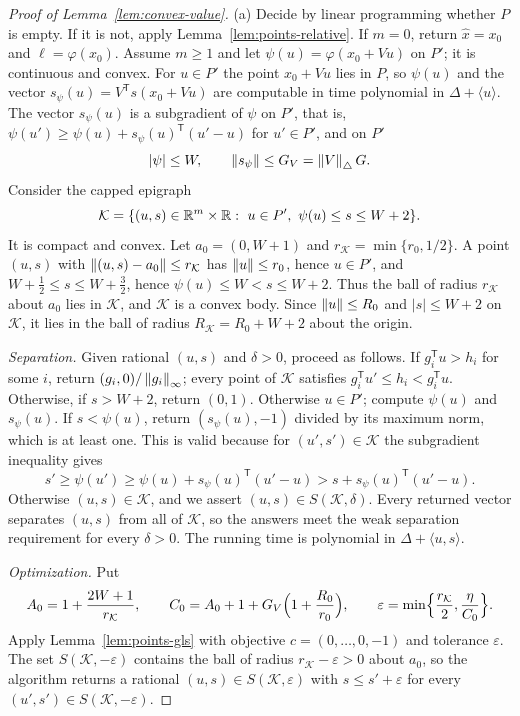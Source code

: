 \begin{proof}[Proof of Lemma~\ref{lem:convex-value}]
(a) Decide by linear programming whether $P$ is empty. If it is not, apply
Lemma~\ref{lem:points-relative}. If $m=0$, return $\hat x=x_0$ and
$\ell=\varphi(x_0)$. Assume $m\ge1$ and let $\psi(u)=\varphi(x_0+Vu)$ on
$P'$; it is continuous and convex. For $u\in P'$ the point $x_0+Vu$ lies in
$P$, so $\psi(u)$ and the vector
$s_\psi(u)=V^{\mathsf T}s(x_0+Vu)$ are computable in time polynomial in
$\Delta+\langle u\rangle$. The vector $s_\psi(u)$ is a subgradient of $\psi$
on $P'$, that is, $\psi(u')\ge\psi(u)+s_\psi(u)^{\mathsf T}(u'-u)$ for
$u'\in P'$, and on $P'$
\[
 |\psi|\le W,\qquad\left\lVert s_\psi\right\rVert\le G_V=\left\lVert V\right\rVert_\triangle G .
\]
Consider the capped epigraph
\[
 \mathcal K=\{(u,s)\in\R^m\times\R:\ u\in P',\ \psi(u)\le s\le W+2\}.
\]
It is compact and convex. Let $a_0=(0,W+1)$ and
$r_{\mathcal K}=\min\{r_0,1/2\}$. A point $(u,s)$ with
$\left\lVert(u,s)-a_0\right\rVert\le r_{\mathcal K}$ has $\left\lVert u\right\rVert\le r_0$, hence $u\in P'$,
and $W+\tfrac12\le s\le W+\tfrac32$, hence $\psi(u)\le W<s\le W+2$. Thus the
ball of radius $r_{\mathcal K}$ about $a_0$ lies in $\mathcal K$, and
$\mathcal K$ is a convex body. Since $\left\lVert u\right\rVert\le R_0$ and
$|s|\le W+2$ on $\mathcal K$, it lies in the ball of radius
$R_{\mathcal K}=R_0+W+2$ about the origin.

\emph{Separation.} Given rational $(u,s)$ and $\delta>0$, proceed as follows.
If $g_i^{\mathsf T}u>h_i$ for some $i$, return
$(g_i,0)/\left\lVert g_i\right\rVert_\infty$; every point of $\mathcal K$ satisfies
$g_i^{\mathsf T}u'\le h_i<g_i^{\mathsf T}u$. Otherwise, if $s>W+2$, return
$(0,1)$. Otherwise $u\in P'$; compute $\psi(u)$ and $s_\psi(u)$. If $s<\psi(u)$,
return $(s_\psi(u),-1)$ divided by its maximum norm, which is at least one.
This is valid because for $(u',s')\in\mathcal K$ the subgradient inequality
gives
\[
 s'\ge\psi(u')\ge\psi(u)+s_\psi(u)^{\mathsf T}(u'-u)
 >s+s_\psi(u)^{\mathsf T}(u'-u).
\]
Otherwise $(u,s)\in\mathcal K$, and we assert $(u,s)\in S(\mathcal
K,\delta)$. Every returned vector separates $(u,s)$ from all of
$\mathcal K$, so the answers meet the weak separation requirement for every
$\delta>0$. The running time is polynomial in $\Delta+\langle u,s\rangle$.

\emph{Optimization.} Put
\[
 A_0=1+\frac{2W+1}{r_{\mathcal K}},\qquad
 C_0=A_0+1+G_V\Bigl(1+\frac{R_0}{r_0}\Bigr),\qquad
 \varepsilon=\min\Bigl\{\frac{r_{\mathcal K}}2,\frac\eta{C_0}\Bigr\}.
\]
Apply Lemma~\ref{lem:points-gls} with objective $c=(0,\ldots,0,-1)$ and
tolerance $\varepsilon$. The set $S(\mathcal K,-\varepsilon)$ contains the
ball of radius $r_{\mathcal K}-\varepsilon>0$ about $a_0$, so the algorithm
returns a rational $(u,s)\in S(\mathcal K,\varepsilon)$ with
$s\le s'+\varepsilon$ for every $(u',s')\in S(\mathcal K,-\varepsilon)$.


\end{proof}
